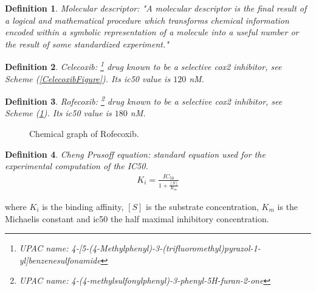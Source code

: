 \documentclass[11pt]{article}
\newtheorem{definition}{Definition}
\begin{document}
\begin{definition}\label{definitionChemicalDescriptors}
Molecular descriptor: "A molecular descriptor is the final result of a logical and mathematical procedure which transforms chemical information encoded within a symbolic representation of a molecule into a useful number or the result of some standardized experiment."\cite{DescriptorsBook}
\end{definition}

\begin{definition}\label{definitionCelecoxib}
Celecoxib: \footnote{UPAC name: 4-[5-(4-Methylphenyl)-3-(trifluoromethyl)pyrazol-1-yl]benzenesulfonamide} drug known to be a selective \gls{cox2} inhibitor, see Scheme (\ref{CelecoxibFigure}). Its \gls{ic50} value is $120$ nM.
\end{definition}

\begin{definition}\label{definitionRofecoxib}
Rofecoxib: \footnote{UPAC name: 4-(4-methylsulfonylphenyl)-3-phenyl-5H-furan-2-one} drug known to be a selective \gls{cox2} inhibitor, see Scheme (\ref{RofecoxibFigure}). Its \gls{ic50} value is $180$ nM.
\end{definition}


\begin{figure}[H]
\captionsetup{type=scheme}
\centering
{}
\caption{Chemical graph of Rofecoxib.}
\label{RofecoxibFigure}
\end{figure}
\begin{definition}\label{definitionChengPrusoff}
Cheng Prusoff equation: standard equation used for the experimental computation of the IC50.
	\begin{align*}
		K_i=\frac{IC_{50}}{1+\frac{[S]}{K_m}}
	\end{align*}
\end{definition}
where $K_i$ is the binding affinity, $[S]$ is the substrate concentration, $K_m$ is the Michaelis constant and \gls{ic50} the half maximal inhibitory concentration.
\end{document}
